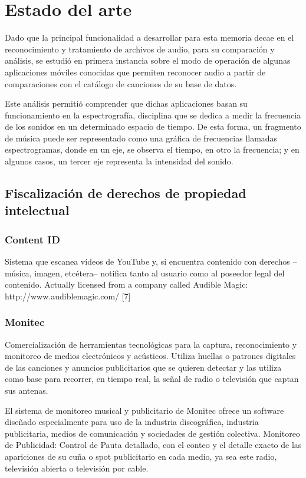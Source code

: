 
\chapter{Estado del arte}
Dado que la principal funcionalidad a desarrollar para esta memoria decae en el reconocimiento y tratamiento de archivos de audio, para su comparación y análisis, se estudió en primera instancia sobre el modo de operación de algunas aplicaciones móviles conocidas que permiten reconocer audio a partir de comparaciones con el catálogo de canciones de su base de datos. 

\bigskip

Este análisis permitió comprender que dichas aplicaciones basan su funcionamiento en la espectrografía, disciplina que se dedica a medir la frecuencia de los sonidos en un determinado espacio de tiempo. De esta forma, un fragmento de música puede ser representado como una gráfica de frecuencias llamadas espectrogramas, donde en un eje, se observa el tiempo, en otro la frecuencia; y en algunos casos, un tercer eje representa la intensidad del sonido.


\section{Fiscalización de derechos de propiedad intelectual}
\lipsum[2-4]

\subsection{Content ID}
Sistema que escanea vídeos de YouTube y, si encuentra contenido con derechos –música, imagen, etcétera– notifica tanto al usuario como al poseedor legal del contenido.
Actually licensed from a company called Audible Magic: http://www.audiblemagic.com/ [7]


\subsection{Monitec}
Comercialización de herramientas tecnológicas para la captura, reconocimiento y monitoreo de medios electrónicos y acústicos. Utiliza huellas o patrones digitales de las canciones y anuncios publicitarios que se quieren detectar y las utiliza como base para recorrer, en tiempo real, la señal de radio o televisión que captan sus antenas.

\bigskip

El sistema de monitoreo musical y publicitario de Monitec ofrece un software diseñado especialmente para uso de la industria discográfica, industria publicitaria, medios de comunicación y sociedades de gestión colectiva. Monitoreo de Publicidad: Control de Pauta detallado, con el conteo y el detalle exacto de las apariciones de su cuña o spot publicitario en cada medio, ya sea este radio, televisión abierta o televisión por cable.



